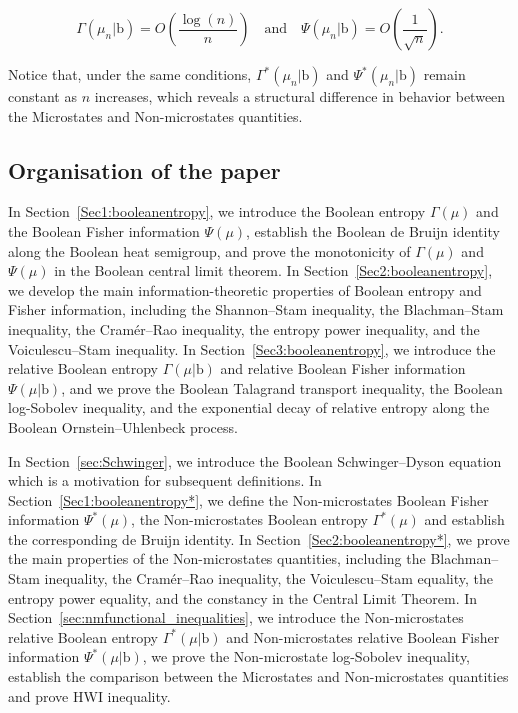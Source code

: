 \documentclass[10pt, reqno]{amsart}
\numberwithin{equation}{section}
\theoremstyle{definition}
\theoremstyle{plain}
\theoremstyle{remark}
\newcommand{\1}{\mathbbm{1}}
\begin{document}
$$ \Gamma(\mu_n|\mathbb{\mathrm{b}})=O\left(\frac{\log(n)}{n}\right)\ \ \ \text{ and }\ \ \ \Psi(\mu_n|\mathbb{\mathrm{b}})=O\left(\frac{1}{\sqrt{n}}\right).$$

Notice that, under the same conditions, $\Gamma^*(\mu_n|\mathbb{\mathrm{b}})$ and $\Psi^*(\mu_n|\mathbb{\mathrm{b}})$  remain constant as $n$ increases, which reveals a structural difference in behavior between the Microstates and Non-microstates quantities.

\subsection*{Organisation of the paper}

In Section~\ref{Sec1:booleanentropy}, we introduce the Boolean entropy $\Gamma(\mu)$ and the Boolean Fisher information $\Psi(\mu)$, establish the Boolean de Bruijn identity along the Boolean heat semigroup, and prove the monotonicity of $\Gamma(\mu)$ and $\Psi(\mu)$ in the Boolean central limit theorem. 
In Section~\ref{Sec2:booleanentropy}, we develop the main information-theoretic properties of Boolean entropy and Fisher information, including the Shannon--Stam inequality, the Blachman--Stam inequality, the Cramér--Rao inequality, the entropy power inequality, and the Voiculescu--Stam inequality. 
In Section~\ref{Sec3:booleanentropy}, we introduce the relative Boolean entropy $\Gamma(\mu|\mathbb{\mathrm{b}})$ and relative Boolean Fisher information $\Psi(\mu|\mathbb{\mathrm{b}})$, and we prove the Boolean Talagrand transport inequality, the Boolean log-Sobolev inequality, and the exponential decay of relative entropy along the Boolean Ornstein--Uhlenbeck process.

In Section~\ref{sec:Schwinger}, we introduce the Boolean Schwinger--Dyson equation which is a motivation for subsequent definitions. In Section~\ref{Sec1:booleanentropy*}, we define the Non-microstates Boolean Fisher information $\Psi^*(\mu)$, the Non-microstates Boolean entropy $\Gamma^*(\mu)$ and establish the corresponding de Bruijn identity. In Section~\ref{Sec2:booleanentropy*}, we prove the main properties of the Non-microstates quantities, including the Blachman--Stam inequality, the Cramér--Rao inequality, the Voiculescu--Stam equality, the entropy power equality, and the constancy in the Central Limit Theorem. In Section~\ref{sec:nmfunctional_inequalities}, we introduce the Non-microstates relative Boolean entropy $\Gamma^*(\mu|\mathbb{\mathrm{b}})$ and Non-microstates relative Boolean Fisher information $\Psi^*(\mu|\mathbb{\mathrm{b}})$, we prove the Non-microstate log-Sobolev  inequality, establish the comparison between the Microstates and Non-microstates quantities and prove   HWI inequality.
\end{document}

